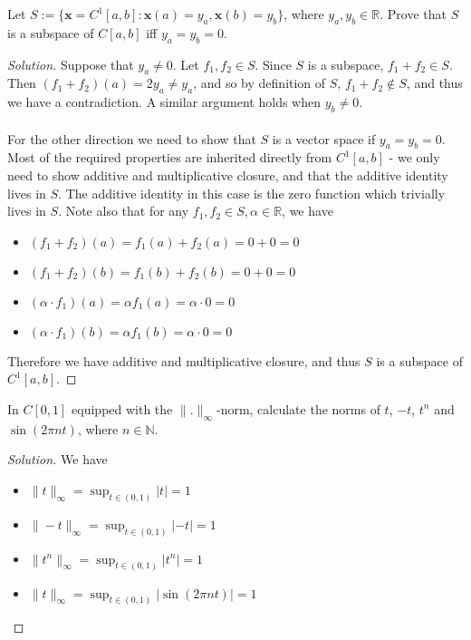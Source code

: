 \documentclass[10pt]{article}
\newenvironment{problem}[2][Problem]{\begin{trivlist}
		\item[\hskip \labelsep {\bfseries #1}\hskip \labelsep {\bfseries #2.}]}{\end{trivlist}}
\begin{document}
	\begin{problem}{1.3}
		Let $S := \{\textbf{x} = C^1[a,b] : \textbf{x}(a) = y_a, \textbf{x}(b)= y_b\}$, where $y_a,y_b\in\mathbb{R}$.
		Prove that $S$ is a subspace of $C[a,b]$ iff $y_a=y_b=0$.
	\end{problem}
	
	\begin{proof}[Solution]
		Suppose that $y_a\neq 0$. Let $f_1,f_2\in S$. Since $S$ is a subspace, $f_1+f_2\in S$. Then $(f_1+f_2)(a)=2y_a\neq y_a$, and so by definition of $S$, $f_1+f_2\notin S$, and thus we have a contradiction. A similar argument holds when $y_b\neq 0$.
		\\\\
		For the other direction we need to show that $S$ is a vector space if $y_a=y_b=0$. Most of the required properties are inherited directly from $C^1[a,b]$ - we only need to show additive and multiplicative closure, and that the additive identity lives in $S$. The additive identity in this case is the zero function which trivially lives in $S$. Note also that for any $f_1,f_2\in S,\alpha\in\mathbb{R}$, we have
		\begin{itemize}
			\item $(f_1+f_2)(a)=f_1(a)+f_2(a) = 0+0 = 0$
			\item $(f_1+f_2)(b)=f_1(b)+f_2(b) = 0+0 = 0$
			\item $(\alpha\cdot f_1)(a)=\alpha f_1(a)=\alpha\cdot 0=0$
			\item $(\alpha\cdot f_1)(b)=\alpha f_1(b)=\alpha\cdot 0=0$
		\end{itemize}
		Therefore we have additive and multiplicative closure, and thus $S$ is a subspace of $C^1[a,b]$.
	\end{proof}

	\begin{problem}{1.4}
		In $C[0,1]$ equipped with the $\|.\|_\infty$-norm, calculate the norms of $t$,
	$-t$, $t^n$ and $\sin(2\pi nt)$, where $n\in\mathbb{N}$.
	\end{problem}
	
	\begin{proof}[Solution]
		We have
		\begin{itemize}
			\item $\|t\|_\infty=\sup_{t\in(0,1)}|t|=1$
			\item $\|-t\|_\infty=\sup_{t\in(0,1)}|-t|=1$
			\item $\|t^n\|_\infty=\sup_{t\in(0,1)}|t^n|=1$
			\item $\|t\|_\infty=\sup_{t\in(0,1)}|\sin(2\pi nt)|=1$
		\end{itemize}

	\end{proof}
\end{document}
